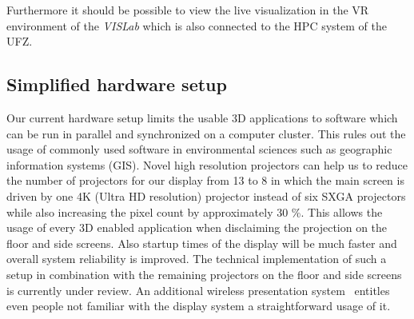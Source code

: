 \documentclass[twocolumn]{svjour3}          %
\newcommand{\myedit}[2]{\textcolor{red}{\st{#1}} \textcolor{blue}{#2}}
\begin{document}
Furthermore it should be possible to view the live visualization in the VR environment of the \emph{VISLab} which is also connected to the HPC system of the UFZ.

\subsection{Simplified hardware setup}
\label{simplified-hardware-setup}

Our current hardware setup limits the usable 3D applications to software which can be run in parallel and synchronized on a computer cluster. This rules out the usage of commonly used software in environmental sciences such as geographic information systems (GIS). Novel high resolution projectors can help us to reduce the number of projectors for our display from 13 to 8 in which the main screen is driven by one 4K (Ultra HD resolution) projector instead of six SXGA projectors while also increasing the pixel count by approximately 30 \%. This allows the usage of every 3D enabled application when disclaiming the projection on the floor and side screens. Also startup times of the display will be much faster and overall system reliability is improved. The technical implementation of such a setup in combination with the remaining projectors on the floor and side screens is currently under review. An additional wireless presentation system~\cite{web:clickshare} entitles even people not familiar with the display system a straightforward usage of it.





\end{document}
